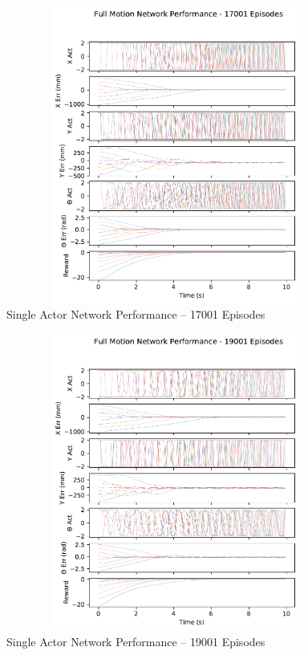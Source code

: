 \begin{figure}[H]
	\centering
	\includegraphics[width=6in, height=3.85in, keepaspectratio]{figures/train_figs/all_transitions/3_17001.pdf}
	\caption{Single Actor Network Performance -- 17001 Episodes}
\end{figure}
\begin{figure}[H]
	\centering
	\includegraphics[width=6in, height=3.85in, keepaspectratio]{figures/train_figs/all_transitions/3_19001.pdf}
	\caption{Single Actor Network Performance -- 19001 Episodes}
\end{figure}
